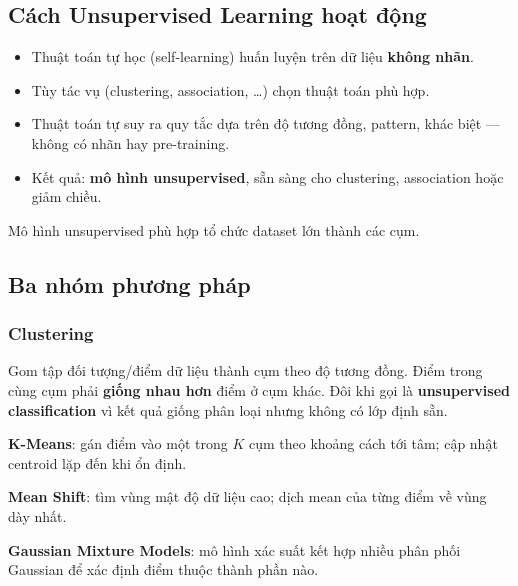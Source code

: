 \subsection{Cách Unsupervised Learning hoạt động}

\begin{phuongphap}[title={Quy trình huấn luyện}]
\begin{itemize}
  \item Thuật toán tự học (self-learning) huấn luyện trên dữ liệu \textbf{không nhãn}.
  \item Tùy tác vụ (clustering, association, \ldots) chọn thuật toán phù hợp.
  \item Thuật toán tự suy ra quy tắc dựa trên độ tương đồng, pattern, khác biệt --- không có nhãn hay pre-training.
  \item Kết quả: \textbf{mô hình unsupervised}, sẵn sàng cho clustering, association hoặc giảm chiều.
\end{itemize}
\end{phuongphap}

\begin{ynghia}[title={Phù hợp bài toán phức tạp}]
Mô hình unsupervised phù hợp tổ chức dataset lớn thành các cụm.
\end{ynghia}

\subsection{Ba nhóm phương pháp}

\subsubsection{Clustering}

\begin{dinhnghia}[title={Clustering}]
Gom tập đối tượng/điểm dữ liệu thành cụm theo độ tương đồng.
Điểm trong cùng cụm phải \textbf{giống nhau hơn} điểm ở cụm khác.
Đôi khi gọi là \textbf{unsupervised classification} vì kết quả giống phân loại nhưng không có lớp định sẵn.
\end{dinhnghia}

\begin{ynghia}[title={Một số thuật toán}]
\textbf{K-Means}: gán điểm vào một trong $K$ cụm theo khoảng cách tới tâm; cập nhật centroid lặp đến khi ổn định.

\textbf{Mean Shift}: tìm vùng mật độ dữ liệu cao; dịch mean của từng điểm về vùng dày nhất.

\textbf{Gaussian Mixture Models}: mô hình xác suất kết hợp nhiều phân phối Gaussian để xác định điểm thuộc thành phần nào.
\end{ynghia}

